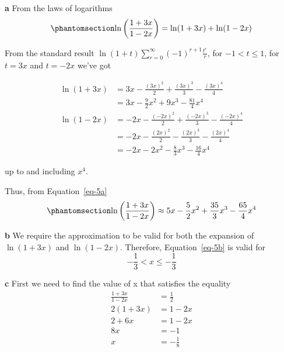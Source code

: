\documentclass[
  a4paper,
]{report}
\begin{document}
\begin{tcolorbox}[enhanced jigsaw, leftrule=.75mm, left=2mm, opacitybacktitle=0.6, breakable, bottomtitle=1mm, colframe=quarto-callout-tip-color-frame, opacityback=0, colbacktitle=quarto-callout-tip-color!10!white, toptitle=1mm, arc=.35mm, titlerule=0mm, coltitle=black, rightrule=.15mm, bottomrule=.15mm, toprule=.15mm, title={Solution}, colback=white]

\textbf{a} From the laws of logarithms
\begin{equation}\phantomsection\label{eq-5a}{\ln \left( \frac{1+3x}{1-2x}\right) = \ln (1+3x) + \ln (1 -2x)}\end{equation}

From the standard result
\(\ln(1+t) \sum_{r=0}^{\infty}(-1)^{r+1}\frac{t^r}{r}\), for
\(-1 < t \leq 1\), for \(t=3x\) and \(t=-2x\) we've got

\begin{equation*}
\begin{split}
\ln (1+3x) &=3x-\frac{(3x)^2}{2}+\frac{(3x)^3}{3}-\frac{(3x)^4}{4} \\
&= 3x-\frac{9}{2}x^2+9x^3-\frac{81}{4}x^4 \\
\ln (1-2x) &=-2x-\frac{(-2x)^2}{2}+\frac{(-2x)^3}{3}-\frac{(-2x)^4}{4} \\
&=-2x-\frac{(2x)^2}{2}-\frac{(2x)^3}{3}-\frac{(2x)^4}{4} \\
&=-2x-2x^2 -\frac{8}{3}x^3-\frac{16}{4}x^4
\end{split}
\end{equation*}

up to and including \(x^4\).

Thus, from Equation~\ref{eq-5a}
\begin{equation}\phantomsection\label{eq-5b}{\ln \left( \frac{1+3x}{1-2x}\right) \approx 5x-\frac{5}{2}x^2+\frac{35}{3}x^3-\frac{65}{4}x^4}\end{equation}

\textbf{b} We require the approximation to be valid for both the
expansion of \(\ln(1+3x)\) and \(\ln(1-2x)\). Therefore,
Equation~\ref{eq-5b} is valid for \[-\frac{1}{3} < x \leq -\frac{1}{3}\]

\textbf{c} First we need to find the value of x that satisfies the
equality \begin{equation*}
\begin{split}
\frac{1+3x}{1-2x}&=\frac{1}{2} \\
2(1+3x) &=1-2x \\
2+6x&=1-2x\\
8x&=-1\\
x&=-\frac{1}{8}
\end{split}
\end{equation*}


\end{tcolorbox}
\end{document}
